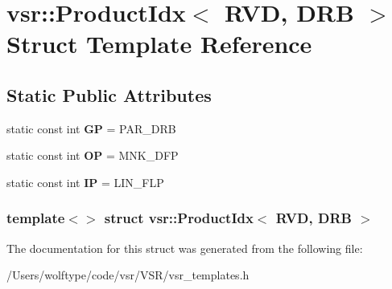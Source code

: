 \hypertarget{structvsr_1_1_product_idx_3_01_r_v_d_00_01_d_r_b_01_4}{\section{vsr\-:\-:Product\-Idx$<$ R\-V\-D, D\-R\-B $>$ Struct Template Reference}
\label{structvsr_1_1_product_idx_3_01_r_v_d_00_01_d_r_b_01_4}
}
\subsection*{Static Public Attributes}
\begin{DoxyCompactItemize}
\item 
\hypertarget{structvsr_1_1_product_idx_3_01_r_v_d_00_01_d_r_b_01_4_a69c2a760dced928df1b611faae714522}{static const int {\bfseries G\-P} = P\-A\-R\-\_\-\-D\-R\-B}\label{structvsr_1_1_product_idx_3_01_r_v_d_00_01_d_r_b_01_4_a69c2a760dced928df1b611faae714522}

\item 
\hypertarget{structvsr_1_1_product_idx_3_01_r_v_d_00_01_d_r_b_01_4_a47fd57a3c28d3777d15ac57d4b62c0e5}{static const int {\bfseries O\-P} = M\-N\-K\-\_\-\-D\-F\-P}\label{structvsr_1_1_product_idx_3_01_r_v_d_00_01_d_r_b_01_4_a47fd57a3c28d3777d15ac57d4b62c0e5}

\item 
\hypertarget{structvsr_1_1_product_idx_3_01_r_v_d_00_01_d_r_b_01_4_a6b804394b2738c7b29b30c371eeb6080}{static const int {\bfseries I\-P} = L\-I\-N\-\_\-\-F\-L\-P}\label{structvsr_1_1_product_idx_3_01_r_v_d_00_01_d_r_b_01_4_a6b804394b2738c7b29b30c371eeb6080}

\end{DoxyCompactItemize}
\subsubsection*{template$<$$>$ struct vsr\-::\-Product\-Idx$<$ R\-V\-D, D\-R\-B $>$}



The documentation for this struct was generated from the following file\-:\begin{DoxyCompactItemize}
\item 
/\-Users/wolftype/code/vsr/\-V\-S\-R/vsr\-\_\-templates.\-h\end{DoxyCompactItemize}
